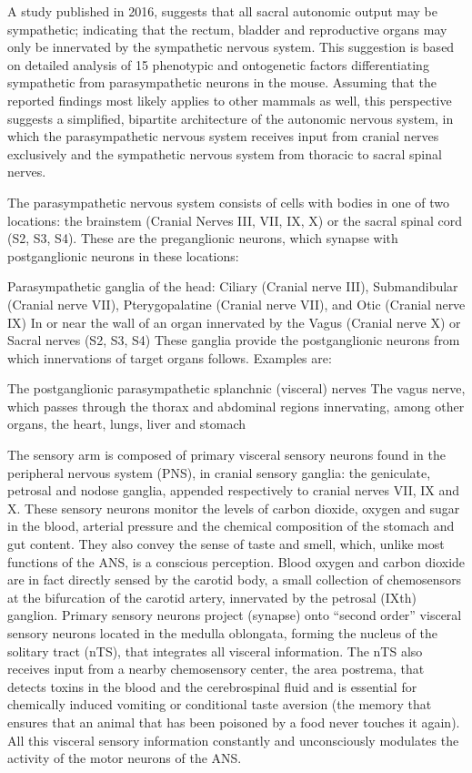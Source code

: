 A study published in 2016, suggests that all sacral autonomic output may be sympathetic; indicating that the rectum, bladder and reproductive organs may only be innervated by the sympathetic nervous system. This suggestion is based on detailed analysis of 15 phenotypic and ontogenetic factors differentiating sympathetic from parasympathetic neurons in the mouse. Assuming that the reported findings most likely applies to other mammals as well, this perspective suggests a simplified, bipartite architecture of the autonomic nervous system, in which the parasympathetic nervous system receives input from cranial nerves exclusively and the sympathetic nervous system from thoracic to sacral spinal nerves.

The parasympathetic nervous system consists of cells with bodies in one of two locations: the brainstem (Cranial Nerves III, VII, IX, X) or the sacral spinal cord (S2, S3, S4). These are the preganglionic neurons, which synapse with postganglionic neurons in these locations:

Parasympathetic ganglia of the head: Ciliary (Cranial nerve III), Submandibular (Cranial nerve VII), Pterygopalatine (Cranial nerve VII), and Otic (Cranial nerve IX)
In or near the wall of an organ innervated by the Vagus (Cranial nerve X) or Sacral nerves (S2, S3, S4)
These ganglia provide the postganglionic neurons from which innervations of target organs follows. Examples are:

The postganglionic parasympathetic splanchnic (visceral) nerves
The vagus nerve, which passes through the thorax and abdominal regions innervating, among other organs, the heart, lungs, liver and stomach

The sensory arm is composed of primary visceral sensory neurons found in the peripheral nervous system (PNS), in cranial sensory ganglia: the geniculate, petrosal and nodose ganglia, appended respectively to cranial nerves VII, IX and X. These sensory neurons monitor the levels of carbon dioxide, oxygen and sugar in the blood, arterial pressure and the chemical composition of the stomach and gut content. They also convey the sense of taste and smell, which, unlike most functions of the ANS, is a conscious perception. Blood oxygen and carbon dioxide are in fact directly sensed by the carotid body, a small collection of chemosensors at the bifurcation of the carotid artery, innervated by the petrosal (IXth) ganglion. Primary sensory neurons project (synapse) onto ``second order'' visceral sensory neurons located in the medulla oblongata, forming the nucleus of the solitary tract (nTS), that integrates all visceral information. The nTS also receives input from a nearby chemosensory center, the area postrema, that detects toxins in the blood and the cerebrospinal fluid and is essential for chemically induced vomiting or conditional taste aversion (the memory that ensures that an animal that has been poisoned by a food never touches it again). All this visceral sensory information constantly and unconsciously modulates the activity of the motor neurons of the ANS.

